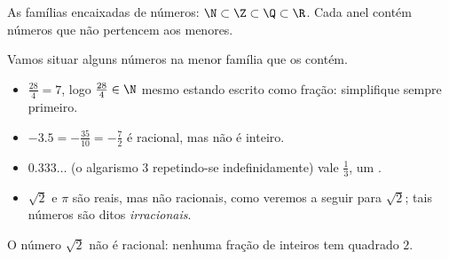 \begin{omfigure}

{\small As famílias encaixadas de números: $\N \subset \Z \subset \Q \subset
\R$. Cada anel contém números que não pertencem aos menores.}
\end{omfigure}

\begin{example}\label{ex:g10:numbers:classify}
Vamos situar alguns números na menor família que os contém.
\begin{itemize}
  \item $\frac{28}{4} = 7$, logo $\frac{28}{4} \in \N$ mesmo estando
        escrito como fração: simplifique sempre primeiro.
  \item $-3.5 = -\frac{35}{10} = -\frac72$ é racional, mas não é inteiro.
  \item $0.333\dots$ (o algarismo $3$ repetindo-se indefinidamente) vale
        $\frac13$, um .
  \item $\sqrt 2$ e $\pi$ são reais, mas não racionais, como veremos a
        seguir para $\sqrt 2$; tais números são ditos
        \emph{irracionais}.
\end{itemize}
\end{example}

\begin{theorem}\label{thm:g10:numbers:sqrt2}
O número $\sqrt 2$ não é racional: nenhuma fração de inteiros tem
quadrado $2$.
\end{theorem}

